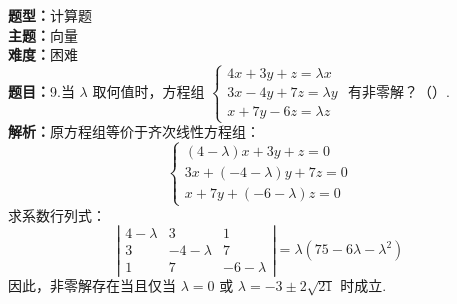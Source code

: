 \documentclass{ctexart}
\newenvironment{question}[5]{%
	\noindent\textbf{题型：}#1\\
	\textbf{主题：}#2\\
	\textbf{难度：}#3\\
	\textbf{题目：}#4\\
	\textbf{解析：}#5\\
	\vspace{1em}
}{}
\begin{document}
	\begin{question}
		{计算题}
		{向量}
		{困难}
		{9.当 \(\lambda\) 取何值时，方程组 \(\left\{\begin{array}{l}4x+3y+z=\lambda x \\ 3x-4y+7z=\lambda y \\ x+7y-6z=\lambda z\end{array}\right.\) 有非零解？（）.}
		{原方程组等价于齐次线性方程组：
			\[
			\left\{\begin{array}{l}(4-\lambda)x + 3y + z = 0 \\
				3x + (-4-\lambda)y + 7z = 0 \\
				x + 7y + (-6-\lambda)z = 0
			\end{array}\right.
			\]
			求系数行列式：
			\[
			\left|\begin{array}{ccc}
				4-\lambda & 3 & 1 \\
				3 & -4-\lambda & 7 \\
				1 & 7 & -6-\lambda
			\end{array}\right| = \lambda(75 - 6\lambda - \lambda^2)
			\]
			因此，非零解存在当且仅当 \(\lambda=0\) 或 \(\lambda = -3 \pm 2\sqrt{21}\) 时成立. }
	\end{question}
	
\end{document}
